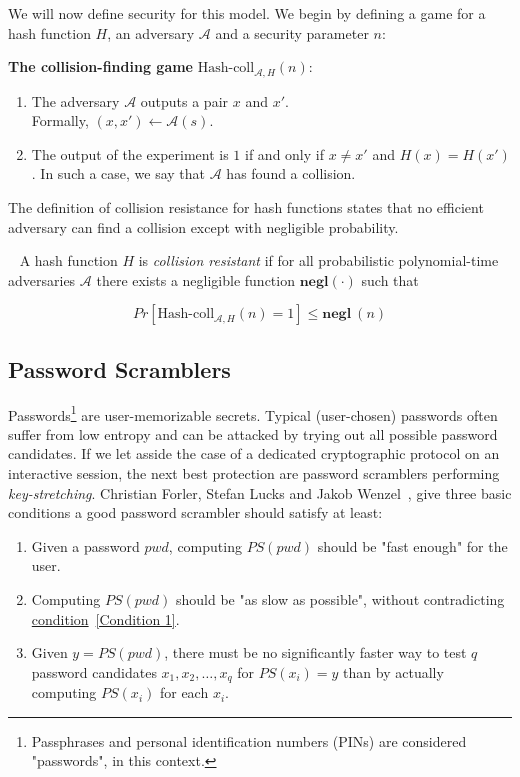 We will now define security for this model. We begin by defining a game for a hash function $H$, an adversary $\mathcal{A}$ and a security parameter $n$:

\vspace{0.2cm}
\noindent \textbf{The collision-finding game} $\mbox{Hash-coll}_{\mathcal{A},H}(n)$: ~\cite{Katz:2007:IMC:1206501}
\begin{enumerate}
  \item The adversary $\mathcal{A}$ outputs a pair $x$ and $x'$. \\
  Formally, $(x,x') \leftarrow \mathcal{A}(s)$.
  \item The output of the experiment is $1$ if and only if $x \neq x'$ and $H(x) = H(x')$. In such a case, we say that $\mathcal{A}$ has found a collision.
\end{enumerate}
%
The definition of collision resistance for hash functions states that no efficient adversary can find a collision except with negligible probability.
%
\begin{definition}~\textnormal{\cite{Katz:2007:IMC:1206501}}
  A hash function $H$ is \emph{collision resistant} if for all probabilistic polynomial-time adversaries $\mathcal{A}$ there exists a negligible function $\textbf{negl}(\cdot)$ such that

\begin{equation} \label{eqn:collision}
  Pr[\mbox{Hash-coll}_{\mathcal{A},H}(n) = 1] \leq \textbf{negl} \: (n)
\end{equation}
\end{definition}

\subsection{Password Scramblers}
Passwords\footnote{Passphrases and personal identification numbers (PINs) are considered "passwords", in this context.} are user-memorizable secrets. Typical (user-chosen) passwords often suffer from low entropy and can be attacked by trying out all possible password candidates. If we let asside the case of a dedicated cryptographic protocol on an interactive session, the next best protection are password scramblers performing \emph{key-stretching}. Christian Forler, Stefan Lucks and Jakob Wenzel~\cite{ForlerLW13}, give three basic conditions a good password scrambler should satisfy at least:

\begin{enumerate}
  \item \label{Condition 1} Given a password $pwd$, computing $PS(pwd)$ should be "fast enough" for the user.
  \item \label{Condition 2} Computing $PS(pwd)$ should be "as slow as possible", without contradicting \hyperref[Condition 1]{condition}~\ref{Condition 1}.
  \item Given $y=PS(pwd)$, there must be no significantly faster way to test $q$ password candidates $x_1, x_2, \dots, x_q$ for $PS(x_i)=y$ than by actually computing $PS(x_i)$ for each $x_i$.
\end{enumerate}

